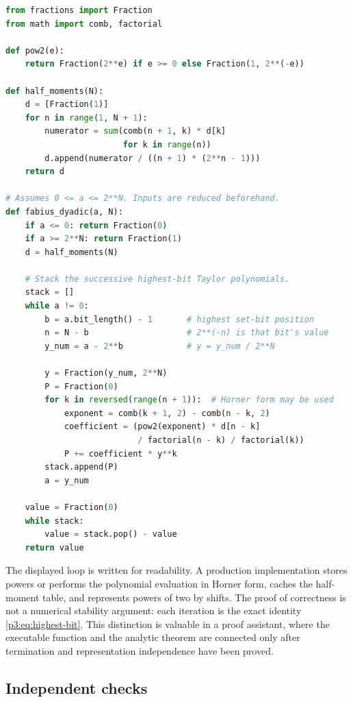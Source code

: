 \documentclass[11pt]{article}
\numberwithin{equation}{section}
\theoremstyle{definition}
\theoremstyle{remark}
\begin{document}
\begin{lstlisting}[language=Python,basicstyle=\ttfamily\small,
  frame=single,caption={Exact inverse-power table and highest-bit evaluation.},
  label={lst:exact-evaluator}]
from fractions import Fraction
from math import comb, factorial

def pow2(e):
    return Fraction(2**e) if e >= 0 else Fraction(1, 2**(-e))

def half_moments(N):
    d = [Fraction(1)]
    for n in range(1, N + 1):
        numerator = sum(comb(n + 1, k) * d[k]
                        for k in range(n))
        d.append(numerator / ((n + 1) * (2**n - 1)))
    return d

# Assumes 0 <= a <= 2**N. Inputs are reduced beforehand.
def fabius_dyadic(a, N):
    if a <= 0: return Fraction(0)
    if a >= 2**N: return Fraction(1)
    d = half_moments(N)

    # Stack the successive highest-bit Taylor polynomials.
    stack = []
    while a != 0:
        b = a.bit_length() - 1       # highest set-bit position
        n = N - b                    # 2**(-n) is that bit's value
        y_num = a - 2**b             # y = y_num / 2**N

        y = Fraction(y_num, 2**N)
        P = Fraction(0)
        for k in reversed(range(n + 1)):  # Horner form may be used
            exponent = comb(k + 1, 2) - comb(n - k, 2)
            coefficient = (pow2(exponent) * d[n - k]
                           / factorial(n - k) / factorial(k))
            P += coefficient * y**k
        stack.append(P)
        a = y_num

    value = Fraction(0)
    while stack:
        value = stack.pop() - value
    return value
\end{lstlisting}

The displayed loop is written for readability.  A production implementation
stores powers or performs the polynomial evaluation in Horner form, caches the
half-moment table, and represents powers of two by shifts.  The proof of
correctness is not a numerical stability argument: each iteration is the
exact identity \eqref{p3:eq:highest-bit}.  This distinction is valuable in a
proof assistant, where the executable function and the analytic theorem are
connected only after termination and representation independence have been
proved.

\subsection{Independent checks}
\end{document}
